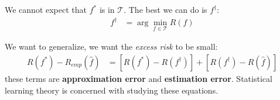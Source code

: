 We cannot expect that $f^*$ is in $\mathcal{T}$. The best we can do is $f^{\dagger}$:
\begin{align*}
    f^{\dagger}&= \arg \min_{f\in \mathcal{T}}R(f)
\end{align*}

We want to generalize,  we want the \textit{excess risk} to be small:
\begin{align*}
     R(f^{*}) - R_{emp}(\hat{f}) &=   \left[R(f^{*})-R(f^{\dagger})\right] + \left[R(f^{\dagger})-R(\hat{f})\right]
\end{align*}
these terms are \textbf{approximation error} and \textbf{estimation error}. Statistical learning theory is concerned with studying these equations.
